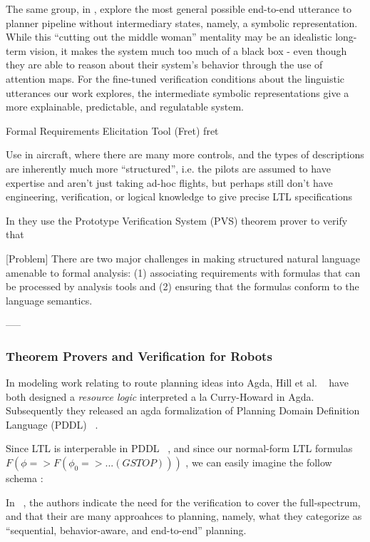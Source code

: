 \documentclass{article}
\begin{document}
The same group, in \cite{kuo2020deep}, explore the most general possible
end-to-end utterance to planner pipeline without intermediary states, namely, a
symbolic representation. While this ``cutting out the middle woman'' mentality
may be an idealistic long-term vision, it makes the system much too much of a
black box - even though they are able to reason about their system's behavior
through the use of attention maps. For the fine-tuned verification conditions
about the linguistic utterances our work explores, the intermediate symbolic
representations give a more explainable, predictable, and regulatable system.


Formal Requirements Elicitation Tool (Fret) {fret}

Use in aircraft, where there are many more controls, and the types of
descriptions are inherently much more ``structured'', i.e. the pilots are
assumed to have expertise and aren't just taking ad-hoc flights, but perhaps
still don't have engineering, verification, or logical knowledge to give precise
LTL specifications

In \cite{fret} they use the Prototype Verification System (PVS) theorem prover
to verify that

[Problem] There are two major challenges in making structured natural language
amenable to formal analysis: (1) associating requirements with formulas that can
be processed by analysis tools and (2) ensuring that the formulas conform to the
language semantics. \cite{fretish}

-----

\subsubsection{Theorem Provers and Verification for Robots}

In modeling work relating to route planning ideas into Agda, Hill et al.
~\cite{hillResource} have both designed a \emph{resource logic} interpreted a la
Curry-Howard in Agda. Subsequently they released  an agda formalization of
Planning Domain Definition Language (PDDL) ~\cite{hillAction}.

Since LTL is interperable in PDDL
~\cite{ltlPDDL}, and since our normal-form LTL formulas $F (\phi => F (\phi_0 => ... (G STOP)))$
, we can easily imagine the follow schema :

In ~\cite{planningForAV}, the authors indicate the need for the verification to
cover the full-spectrum, and that their are many approahces to planning, namely,
what they categorize as ``sequential, behavior-aware, and end-to-end'' planning.
\end{document}
